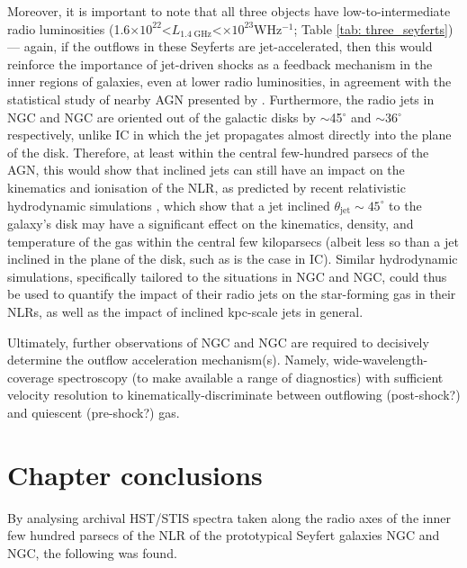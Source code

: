 Moreover, it is important to note that all three objects have low-to-intermediate radio luminosities (1.6$\times10^{22}$\;\textless\;$L_\mathrm{1.4\;GHz}$\;\textless{}$\times10^{23}$\;W\;Hz$^{-1}$; Table \ref{tab: three_seyferts}) --- again, if the outflows in these Seyferts are jet-accelerated, then this would reinforce the importance of jet-driven shocks as a feedback mechanism in the inner regions of galaxies, even at lower radio luminosities, in agreement with the statistical study of nearby AGN presented by \citet{Mullaney2013}. Furthermore, the radio jets in NGC and NGC are oriented out of the galactic disks by $\sim$45$^\circ$ and $\sim$36$^\circ$ respectively, unlike IC in which the jet propagates almost directly into the plane of the disk. Therefore, at least within the central few-hundred parsecs of the AGN, this would show that inclined jets can still have an impact on the kinematics and ionisation of the NLR, as predicted by recent relativistic hydrodynamic simulations \citep{Mukherjee2018, Meenakshi2022b}, which show that a jet inclined $\theta_\mathrm{jet}\sim45^\circ$ to the galaxy's disk may have a significant effect on the kinematics, density, and temperature of the gas within the central few kiloparsecs (albeit less so than a jet inclined in the plane of the disk, such as is the case in IC). Similar hydrodynamic simulations, specifically tailored to the situations in NGC and NGC, could thus be used to quantify the impact of their radio jets on the star-forming gas in their NLRs, as well as the impact of inclined kpc-scale jets in general.

Ultimately, further observations of NGC and NGC are required to decisively determine the outflow acceleration mechanism(s). Namely, wide-wavelength-coverage spectroscopy (to make available a range of diagnostics) with sufficient velocity resolution to kinematically-discriminate between outflowing (post-shock?) and quiescent (pre-shock?) gas.

\section{Chapter conclusions}
\label{section: stis_seyferts: conclusions}

By analysing archival HST/STIS spectra taken along the radio axes of the inner few hundred parsecs of the NLR of the prototypical Seyfert galaxies NGC and NGC, the following was found.

